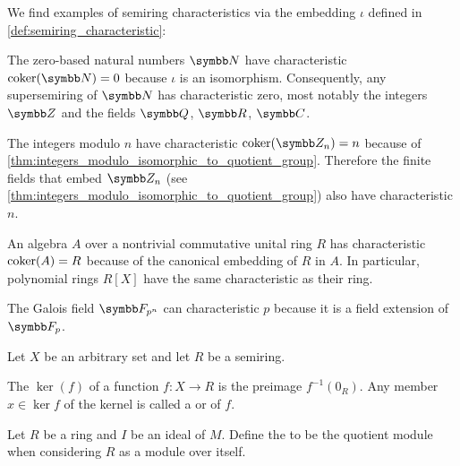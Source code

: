 \begin{example}\label{def:semiring_characteristic}
  We find examples of semiring characteristics via the embedding \( \iota \) defined in \cref{def:semiring_characteristic}:

  \begin{exenum}
     The zero-based natural numbers \( \N \) have characteristic \( \Char(\N) = 0 \) because \( \iota \) is an isomorphism. Consequently, any supersemiring of \( \N \) has characteristic zero, most notably the integers \( \Z \) and the fields \( \Q \), \( \R \), \( \Co \).

     The integers modulo \( n \) have characteristic \( \Char(\Z_n) = n \) because of \cref{thm:integers_modulo_isomorphic_to_quotient_group}. Therefore the finite fields that embed \( \Z_n \) (see \cref{thm:integers_modulo_isomorphic_to_quotient_group}) also have characteristic \( n \).

     An algebra \( A \) over a nontrivial commutative unital ring \( R \) has characteristic \( \operatorname{coker}(A) = R \) because of the canonical embedding of \( R \) in \( A \). In particular, polynomial rings \( R[X] \) have the same characteristic as their ring.

     The Galois field \( \F_{p^n} \) can characteristic \( p \) because it is a field extension of \( \F_p \).
  \end{exenum}
\end{example}

\begin{definition}\label{def:semiring_kernel}
  Let \( X \) be an arbitrary set and let \( R \) be a semiring.

  The  \( \ker(f) \) of a function \( f: X \to R \) is the preimage \( f^{-1}(0_R) \). Any member \( x \in \ker f \) of the kernel is called a  or  of \( f \).
\end{definition}

\begin{definition}\label{def:quotient_semiring}
  Let \( R \) be a ring and \( I \) be an ideal of \( M \). Define the  to be the quotient module when considering \( R \) as a module over itself.
\end{definition}

